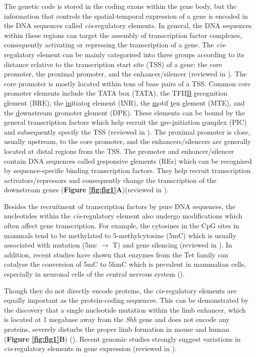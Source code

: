 The genetic code is stored in the coding exons within the gene body, but the information that controls the spatial-temporal expression of a gene is encoded in the DNA sequences called \textit{cis}-regulatory elements. In general, the DNA sequences within these regions can target the assembly of transcription factor complexes, consequently activating or repressing the transcription of a gene. The \textit{cis}-regulatory element can be mainly categorised into three groups according to its distance relative to the transcription start site (TSS) of a gene: the core promoter, the proximal promoter, and the enhancer/silencer (reviewed in \cite{visel2009genomic}). The core promoter is mostly located within tens of base pairs of a TSS. Common core promoter elements include the TATA box (TATA), the TFII\underline{B} \underline{r}ecognition \underline{e}lement (BRE), the \underline{in}itiato\underline{r} element (INR), the \underline{m}otif \underline{t}en \underline{e}lement (MTE), and the \underline{d}ownstream \underline{p}romoter \underline{e}lement (DPE). These elements can be bound by the general transcription factors which help recruit the \underline{p}re-\underline{i}nitiation \underline{c}omplex (PIC) and subsequently specify the TSS (reviewed in \cite{juven-gershon2008the}). The proximal promoter is close, usually upstream, to the core promoter, and the enhancers/silencers are generally located at distal regions from the TSS. The promoter and enhancer/silencer contain DNA sequences called \underline{r}esponsive \underline{e}lements (REs) which can be recognised by sequence-specific binding transcription factors. They help recruit transcription activators/repressors and consequently change the transcription of the downstream genes (\textbf{Figure \ref{fig:fig1}A})(reviewed in \cite{fuda2009defining}).

Besides the recruitment of transcription factors by pure DNA sequences, the nucleotides within the \textit{cis}-regulatory element also undergo modifications which often affect gene transcription. For example, the cytosines in the CpG sites in mammals tend to be methylated to 5-methylcytosine (5mC) which is usually associated with mutation (5mc $\rightarrow$ T) and gene silencing (reviewed in \cite{deaton2011cpg}). In addition, recent studies have shown that enzymes from the Tet family can catalyse the conversion of 5mC to 5hmC which is prevalent in mammalian cells, especially in neuronal cells of the central nervous system (\cite{kriaucionis2009the,tahiliani2009conversion}).

Though they do not directly encode proteins, the \textit{cis}-regulatory elements are equally important as the protein-coding sequences. This can be demonstrated by the discovery that a single nucleotide mutation within the limb enhancer, which is located at 1 megabase away from the \textit{Shh} gene and does not encode any proteins, severely disturbs the proper limb formation in mouse and human (\textbf{Figure \ref{fig:fig1}B}) (\cite{lettice2003a,sagai2005elimination}). Recent genomic studies strongly suggest variations in \textit{cis}-regulatory elements in gene expression (reviewed in \cite{visel2009genomic}).

